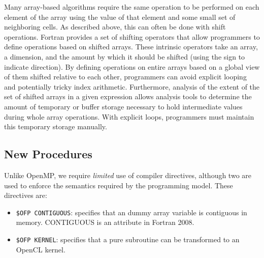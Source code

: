 Many array-based algorithms require the same operation to be performed
on each element of the array using the value of that element and some small
set of neighboring cells. As described above, this can often be done with
shift operations.
Fortran provides a set of shifting operators that allow programmers to
define operations based on shifted arrays.  These intrinsic operators take
an array, a dimension, and the amount by which it should be shifted (using
the sign to indicate direction).  By defining operations on entire arrays
based on a global view of them shifted relative to each other, programmers can
avoid explicit looping and potentially tricky index arithmetic.  Furthermore,
analysis of the extent of the set of shifted arrays in a given expression
allows analysis tools to determine the amount of temporary or buffer storage
necessary to hold intermediate values during whole array operations.  With
explicit loops, programmers must maintain this temporary storage manually.


\subsection{New Procedures}

Unlike OpenMP, we require \emph{limited} use of compiler directives, although
two are used to enforce the semantics required by the programming
model.  These directives are:

\begin{itemize}

\item {\tt \!\$OFP CONTIGUOUS}: specifies that an dummy array variable is
  contiguous in memory. CONTIGUOUS is an attribute in Fortran 2008.

\item {\tt \!\$OFP KERNEL}: specifies that a pure subroutine can be
  transformed to an OpenCL kernel.

\end{itemize}

